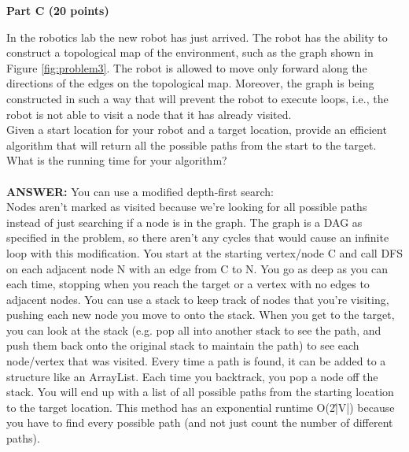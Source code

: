 \documentclass{article}
\begin{document}
\begin{center}
{\bf Part C (20 points)}
\end{center}


 In the robotics lab the new robot has just
arrived. The robot has the ability to construct a topological map of
the environment, such as the graph shown in Figure
\ref{fig:problem3}. The robot is allowed to move only forward along
the directions of the edges on the topological map. Moreover, the
graph is being constructed in such a way that will prevent the robot
to execute loops, i.e., the robot is not able to visit a node that it
has already visited.\\

 Given a start location for your robot and a target
location, provide an efficient algorithm that will return all the
possible paths from the start to the target.  What is the running time
for your algorithm?\\\\
{\bfseries ANSWER: }You can use a modified depth-first search:\\
Nodes aren't marked as visited because we're looking for all possible
paths instead of just searching if a node is in the graph. The graph
is a DAG as specified in the problem, so there aren't any cycles that
would cause an infinite loop with this modification. You start at the
starting vertex/node C and call DFS on each adjacent node N with an
edge from C to N. You go as deep as you can each time, stopping
when you reach the target or a vertex with no edges to adjacent nodes.
You can use a stack to keep track of nodes that you're visiting, pushing
each new node you move to onto the stack. When you get to the
target, you can look at the stack (e.g. pop all into another
stack to see the path, and push them back onto the original stack to
maintain the path) to see each node/vertex that was visited. Every time
a path is found, it can be added to a structure like an ArrayList. Each
time you backtrack, you pop a node off the stack. You will end up with a list of all possible paths from the starting
location to the target location. This method has an exponential runtime O(2\^ |V|) because
you have to find every possible path (and not just count the number of different paths).\\
\end{document}
